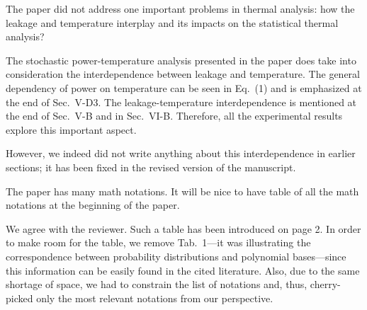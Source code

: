 \begin{reviewer}
The paper did not address one important problems in thermal analysis: how the leakage and temperature interplay and its impacts on the statistical thermal analysis?
\end{reviewer}
\begin{authors}
The stochastic power-temperature analysis presented in the paper does take into consideration the interdependence between leakage and temperature.
The general dependency of power on temperature can be seen in Eq.~(1) and is emphasized at the end of Sec.~V-D3.
The leakage-temperature interdependence is mentioned at the end of Sec.~V-B and in Sec.~VI-B.
Therefore, all the experimental results explore this important aspect.

However, we indeed did not write anything about this interdependence in earlier sections; it has been fixed in the revised version of the manuscript.



\end{authors}

\begin{reviewer}
The paper has many math notations. It will be nice to have table of all the math notations at the beginning of  the paper.
\end{reviewer}
\begin{authors}
We agree with the reviewer.
Such a table has been introduced on page 2.
In order to make room for the table, we remove Tab.~1---it was illustrating the correspondence between probability distributions and polynomial bases---since this information can be easily found in the cited literature.
Also, due to the same shortage of space, we had to constrain the list of notations and, thus, cherry-picked only the most relevant notations from our perspective.

\end{authors}

